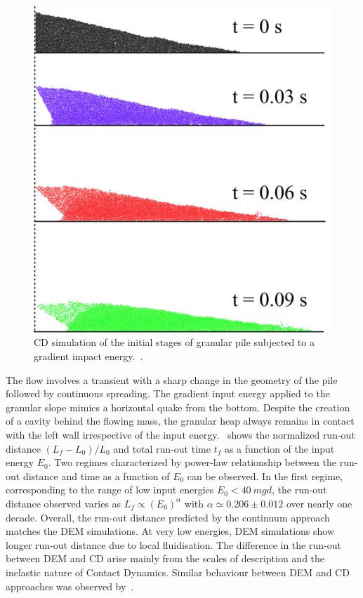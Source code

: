\begin{figure}
\centering
\includegraphics[width=\textwidth]{Gradient_Slope_CD_200J}
\caption{CD simulation of the initial stages of granular pile subjected to a 
gradient impact 
energy.~\citep{Mutabaruka2013}.}
\label{fig:Gradient_Slope_CD_200J}
\end{figure}

The flow involves a transient with a sharp change in the geometry of the pile 
followed by continuous spreading. The gradient input energy applied to the 
granular slope mimics a horizontal quake from the bottom. Despite the creation 
of a cavity behind the flowing mass, the granular heap always remains in 
contact with the left wall irrespective of the input 
energy.~ shows the normalized run-out distance 
$(L_f - L_0)/L_0$ and total run-out time $t_f$ as a function of the input 
energy $E_0$. Two regimes characterized by power-law relationship between 
the run-out distance and time as a function of $E_0$ can be observed. In the 
first regime, corresponding to the range of low input energies $E_0 < 40 \ 
mgd$, the run-out distance observed varies as $L_f \propto (E_0)^\alpha$ with 
$\alpha 
\simeq 0.206 \pm 0.012$ over nearly one decade. Overall, the run-out distance 
predicted by the continuum approach matches the DEM simulations. At very low 
energies, DEM simulations show longer run-out distance due to local 
fluidisation. The difference in the run-out between DEM and CD arise mainly 
from the scales of description and the inelastic nature of Contact Dynamics. 
Similar behaviour between DEM and CD approaches was observed 
by~\citet{Radjai1997}. 


